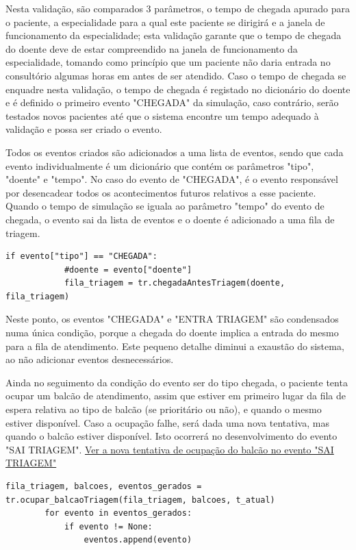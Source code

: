 \documentclass[12pt,a4paper]{article} %
\begin{document}
    Nesta validação, são comparados 3 parâmetros, o tempo de chegada apurado para o paciente, a especialidade para a qual este paciente se dirigirá e a janela de funcionamento da especialidade; esta validação garante que o tempo de chegada do doente deve de estar compreendido na janela de funcionamento da especialidade, tomando como princípio que um paciente não daria entrada no consultório algumas horas em antes de ser atendido. Caso o tempo de chegada se enquadre nesta validação, o tempo de chegada é registado no dicionário do doente e é definido o primeiro evento "CHEGADA" da simulação, caso contrário, serão testados novos pacientes até que o sistema encontre um tempo adequado à validação e possa ser criado o evento.

    \medskip
    Todos os eventos criados são adicionados a uma lista de eventos, sendo que cada evento individualmente é um dicionário que contém os parâmetros "tipo", "doente" e "tempo". No caso do evento de "CHEGADA", é o evento responsável por desencadear todos os acontecimentos futuros relativos a esse paciente. Quando o tempo de simulação se iguala ao parâmetro "tempo" do evento de chegada, o evento sai da lista de eventos e o doente é adicionado a uma fila de triagem.

\begin{verbatim}
if evento["tipo"] == "CHEGADA":
            #doente = evento["doente"] 
            fila_triagem = tr.chegadaAntesTriagem(doente, fila_triagem)    
\end{verbatim}
    
    Neste ponto, os eventos "CHEGADA" e "ENTRA TRIAGEM" são condensados numa única condição, porque a chegada do doente implica a entrada do mesmo para a fila de atendimento. Este pequeno detalhe diminui a exaustão do sistema, ao não adicionar eventos desnecessários. 

    \medskip
    Ainda no seguimento da condição do evento ser do tipo chegada, o paciente tenta ocupar um balcão de atendimento, assim que estiver em primeiro lugar da fila de espera relativa ao tipo de balcão (se prioritário ou não), e quando o mesmo estiver disponível. Caso a ocupação falhe, será dada uma nova tentativa, mas quando o balcão estiver disponível. Isto ocorrerá no desenvolvimento do evento "SAI TRIAGEM". \hyperlink{tenta_ocupar_balcao}{Ver a nova tentativa de ocupação do balcão no evento "SAI TRIAGEM"}
    
\begin{verbatim}
fila_triagem, balcoes, eventos_gerados = 
tr.ocupar_balcaoTriagem(fila_triagem, balcoes, t_atual)
        for evento in eventos_gerados:
            if evento != None:
                eventos.append(evento)
\end{verbatim}
\end{document}
